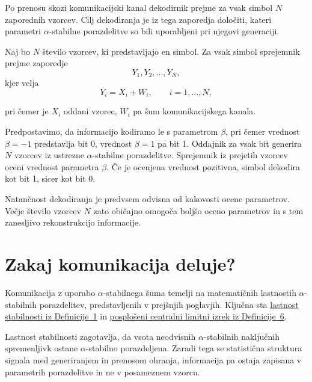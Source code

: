 \documentclass[a4paper, 12pt, openany]{book}
\begin{document}
Po prenosu skozi komunikacijski kanal dekodirnik prejme za vsak simbol $N$ zaporednih vzorcev. Cilj dekodiranja je iz tega zaporedja določiti, kateri parametri $\alpha$-stabilne porazdelitve so bili uporabljeni pri njegovi generaciji.

\begin{tcolorbox}[colback=blue!5!white,colframe=blue!50!black, title=Definicija 8: Teoretično delovanje sprejemnika]
Naj bo $N$ število vzorcev, ki predstavljajo en simbol. Za vsak simbol sprejemnik prejme zaporedje
\[
Y_1,Y_2,\dots,Y_N,
\]
kjer velja
\[
Y_i = X_i + W_i, \qquad i=1,\ldots,N,
\]

pri čemer je $X_i$ oddani vzorec, $W_i$ pa šum komunikacijskega kanala.
\end{tcolorbox}

\begin{tcolorbox}[colback=purple!5!white,colframe=purple!50!black,
title=Primer komunikacije]
\label{komunikacija_primer}
Predpostavimo, da informacijo kodiramo le s parametrom $\beta$, pri čemer vrednost $\beta=-1$ predstavlja bit 0, vrednost $\beta=1$ pa bit 1. Oddajnik za vsak bit generira $N$ vzorcev iz ustrezne $\alpha$-stabilne porazdelitve. Sprejemnik iz prejetih vzorcev oceni vrednost parametra $\beta$. Če je ocenjena vrednost pozitivna, simbol dekodira kot bit 1, sicer kot bit 0.

\end{tcolorbox}


Natančnost dekodiranja je predvsem odvisna od kakovosti ocene parametrov. Večje število vzorcev $N$ zato običajno omogoča boljšo oceno parametrov in s tem zanesljivo rekonstrukcijo informacije.

\section{Zakaj komunikacija deluje?}

Komunikacija z uporabo $\alpha$-stabilnega šuma temelji na matematičnih lastnostih $\alpha$-stabilnih porazdelitev, predstavljenih v prejšnjih poglavjih. Ključna sta \hyperref[def:stable]{lastnost stabilnosti iz Definicije~1} in \hyperref[def:GCLI]{posplošeni centralni limitni izrek iz Definicije~6}.

Lastnost stabilnosti zagotavlja, da vsota neodvisnih $\alpha$-stabilnih naključnih spremenljivk ostane $\alpha$-stabilno porazdeljena. Zaradi tega se statistična struktura signala med generiranjem in prenosom ohranja, informacija pa ostaja zapisana v parametrih porazdelitve in ne v posameznem vzorcu. 
\end{document}
